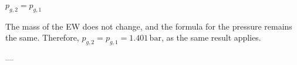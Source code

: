 \( p_{g,2} = p_{g,1} \)  

The mass of the EW does not change, and the formula for the pressure remains the same. Therefore, \( p_{g,2} = p_{g,1} = 1.401 \, \text{bar} \), as the same result applies.  

---